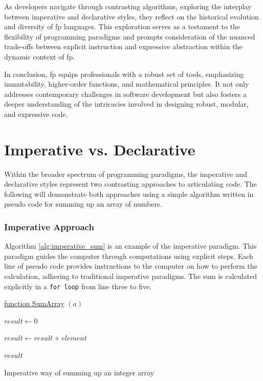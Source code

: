 As developers navigate through contrasting algorithms, exploring the interplay between imperative and declarative styles, they reflect on the historical evolution and diversity of \ac{fp} languages. This exploration serves as a testament to the flexibility of programming paradigms and prompts consideration of the nuanced trade-offs between explicit instruction and expressive abstraction within the dynamic context of \ac{fp}.

In conclusion, \ac{fp} equips professionals with a robust set of tools, emphasizing immutability, higher-order functions, and mathematical principles. It not only addresses contemporary challenges in software development but also fosters a deeper understanding of the intricacies involved in designing robust, modular, and expressive code.
    

\section{Imperative vs. Declarative}

Within the broader spectrum of programming paradigms, the imperative and declarative styles represent two contrasting approaches to articulating code. The following will demonstrate both approaches using a simple algorithm written in pseudo code for summing up an array of numbers.

\subsubsection{Imperative Approach}

Algorithm \ref{alg:imperative_sum} is an example of the imperative paradigm. This paradigm guides the computer through computations using explicit steps. Each line of pseudo code provides instructions to the computer on how to perform the calculation, adhering to traditional imperative paradigms. The sum is calculated explicitly in a \texttt{for loop} from line three to five.

\begin{algorithm}

    \underline{function SumArray} $(a)$\;
    
    \BlankLine
    $result \leftarrow 0$
    
    {
        $result \leftarrow result + element$
    }
    
    \Return $result$
    
    \caption{Imperative way of summing up an integer array}
    \label{alg:imperative_sum}
\end{algorithm}

